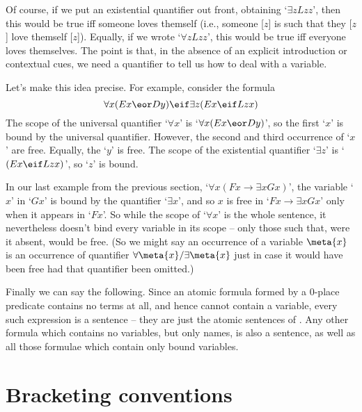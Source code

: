 Of course, if we put an existential quantifier out front, obtaining `$\exists zLzz$', then this would be true iff someone loves themself (i.e., someone [$z$] is such that they [$z$] love themself [$z$]). Equally, if we wrote `$\forall z Lzz$', this would be true iff everyone loves themselves. The point is that, in the absence of an explicit introduction or contextual cues, we need a quantifier to tell us how to deal with a variable. 

Let's make this idea precise.
For example, consider the formula
	$$\forall x(Ex \eor Dy) \eif \exists z(Ex \eif Lzx)$$
The scope of the universal quantifier `$\forall x$' is `$\forall x (Ex \eor Dy)$', so the first `$x$' is bound by the universal quantifier. However, the second and third occurrence of `$x$' are free. Equally, the `$y$' is free. The scope of the existential quantifier `$\exists z$' is `$(Ex \eif Lzx)$', so `$z$' is bound. 

In our last example from the previous section, `$\forall x (Fx \to \exists xGx)$', the variable `$x$' in `$Gx$' is bound by the quantifier `$\exists x$', and so $x$ is free in `$Fx \to \exists x Gx$' only when it appears in `$Fx$'. So while the scope of `$\forall x$' is the whole sentence, it nevertheless doesn't bind every variable in its scope – only those such that, were it absent, would be free. (So we might say an occurrence of a variable $\meta{x}$ is  an occurrence of quantifier $\forall \meta{x}/\exists \meta{x}$ just in case it would have been free had that quantifier been omitted.) 


Finally we can say the following.	
Since an atomic formula formed by a $0$-place predicate contains no terms at all, and hence cannot contain a variable, every such expression is a sentence – they are just the atomic sentences of \TFL. Any other formula which contains no variables, but only names, is also a sentence, as well as all those formulae which contain only bound variables. 


\section{Bracketing conventions}

